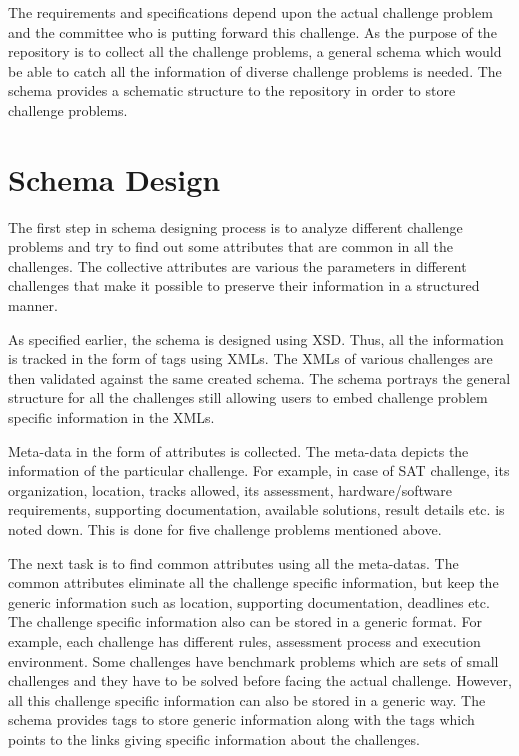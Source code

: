 \documentclass[11pt,letterpaper]{report}
\begin{document}
The requirements and specifications depend upon the actual challenge problem and the committee who is putting forward this challenge. As the purpose of the repository is to collect all the challenge problems, a general schema which would be able to catch all the information of diverse challenge problems is needed. The schema provides a schematic structure to the repository in order to store challenge problems.  

\section{Schema Design} 
The first step in schema designing process is to analyze different challenge problems and try to find out some attributes that are common in all the challenges. The collective attributes are various the parameters in different challenges that make it possible to preserve their information in a structured manner. 

As specified earlier, the schema is designed using XSD. Thus, all the information is tracked in the form of tags using XMLs. The XMLs of various challenges are then validated against the same created schema. The schema portrays the general structure for all the challenges still allowing users to embed challenge problem specific information in the XMLs. 

Meta-data in the form of attributes is collected. The meta-data depicts the information of the particular challenge. For example, in case of SAT challenge, its organization, location, tracks allowed, its assessment, hardware/software requirements, supporting documentation, available solutions, result details etc. is noted down. This is done for five challenge problems mentioned above. 

The next task is to find common attributes using all the meta-datas. The common attributes eliminate all the challenge specific information, but keep the generic information such as location, supporting documentation, deadlines etc. The challenge specific information also can be stored in a generic format. For example, each challenge has different rules, assessment process and execution environment. Some challenges have benchmark problems which are sets of small challenges and they have to be solved before facing the actual challenge. However, all this challenge specific information can also be stored in a generic way. The schema provides tags to store generic information along with the tags which points to the links giving specific information about the challenges.
\end{document}
